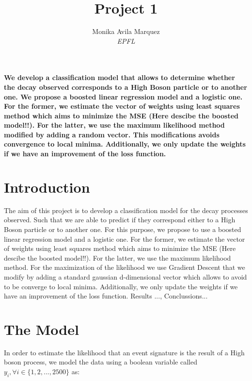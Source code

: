 \documentclass[10pt,conference,compsocconf]{IEEEtran}
\begin{document}
\title{Project 1}

\author{
  Monika Avila Marquez \\
  \textit{EPFL}
}

\maketitle

\begin{abstract}
  
\end{abstract}	\textbf{We develop a classification model that allows to determine whether the decay observed corresponds to a High Boson particle or to another one. We propose a boosted linear regression model and a logistic one. For the former, we estimate the vector of weights using least squares method which aims to minimize the MSE (Here descibe the boosted model!!). For the latter, we use the maximum likelihood method modified by adding a random vector. This modifications avoids convergence to local minima. Additionally, we only update the weights if we have an improvement of the loss function. }

\section{Introduction}

The aim of this project is to develop a classification model for the decay processes observed. Such that we are able to predict if they correspond either to a High Boson particle or to another one. For this purpose, we propose to use a  boosted linear regression model and a logistic one. For the former, we estimate the vector of weights using least squares method which aims to minimize the MSE (Here descibe the boosted model!!). For the latter, we use the maximum likelihood method. For the maximization of the likelihood we use Gradient Descent that we modify by adding a standard gaussian d-dimensional vector which allows to avoid to be converge to local minima. Additionally, we only update the weights if we have an improvement of the loss function.
Results ..., Conclussions...
\section{The Model}
\label{S1}
In order to estimate the likelihood that an event signature is the result of a High boson process, we model the data using a boolean variable called $y_i, \forall i \in  \{1, 2, ..., 2500\}  $ as:
\end{document}
